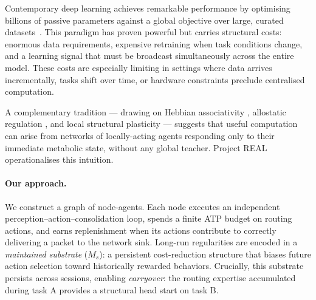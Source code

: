 \documentclass[10pt,twocolumn]{article}
\newcommand{\Ms}{M_s}
\begin{document}
Contemporary deep learning achieves remarkable performance by optimising
billions of passive parameters against a global objective over large, curated
datasets~\citep{lecun2015deep}.
This paradigm has proven powerful but carries structural costs: enormous data
requirements, expensive retraining when task conditions change, and a learning
signal that must be broadcast simultaneously across the entire model.
These costs are especially limiting in settings where data arrives incrementally,
tasks shift over time, or hardware constraints preclude centralised computation.

A complementary tradition --- drawing on Hebbian associativity
\citep{hebb1949organization}, allostatic regulation
\citep{sterling2012allostasis}, and local structural plasticity
\citep{bhatt2009dendritic} --- suggests that useful computation can arise from
networks of locally-acting agents responding only to their immediate metabolic
state, without any global teacher.
Project REAL operationalises this intuition.

\paragraph{Our approach.}
We construct a graph of node-agents.
Each node executes an independent perception--action--consolidation loop, spends
a finite ATP budget on routing actions, and earns replenishment when its actions
contribute to correctly delivering a packet to the network sink.
Long-run regularities are encoded in a \emph{maintained substrate} ($\Ms$): a
persistent cost-reduction structure that biases future action selection toward
historically rewarded behaviors.
Crucially, this substrate persists across sessions, enabling \emph{carryover}:
the routing expertise accumulated during task A provides a structural head start
on task B.
\end{document}
